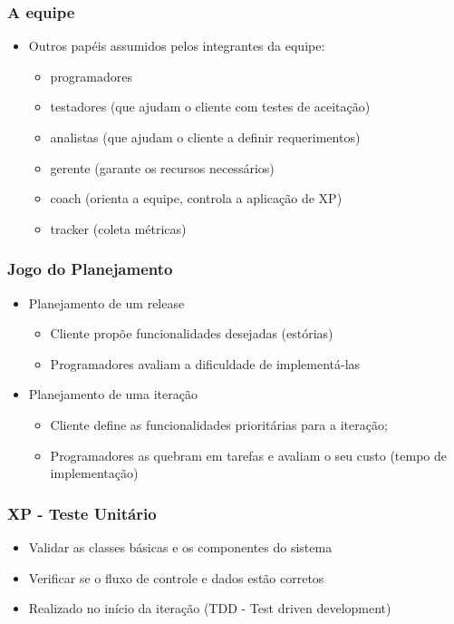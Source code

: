 \begin{frame}
 \frametitle{A equipe}
 \begin{itemize}
  \item  Outros papéis assumidos pelos integrantes da equipe:
  \begin{itemize}
   \item programadores
   \item  testadores (que ajudam o cliente com testes de
aceitação)
    \item analistas (que ajudam o cliente a definir requerimentos)
    \item gerente (garante os recursos necessários)
    \item coach (orienta a equipe, controla a aplicação de XP)
    \item tracker (coleta métricas)
  \end{itemize}
 \end{itemize}
\end{frame}


\begin{frame}
 \frametitle{Jogo do Planejamento}
 \begin{itemize}
  \item Planejamento de um release
  \begin{itemize}
   \item  Cliente propõe funcionalidades desejadas (estórias)
    \item Programadores avaliam a dificuldade de
implementá-las
  \end{itemize}
  \item Planejamento de uma iteração
  \begin{itemize}
   \item Cliente define as funcionalidades prioritárias para a
iteração;
  \item Programadores as quebram em tarefas e avaliam o
seu custo (tempo de implementação)
  \end{itemize}
 \end{itemize}
\end{frame}

\begin{frame}
 \frametitle{XP - Teste Unitário}
 \begin{itemize}
  \item  Validar as classes básicas e os componentes do sistema 
  \item Verificar se o fluxo de controle e dados estão corretos
  \item  Realizado no início da iteração (TDD - Test driven development)
 \end{itemize}
\end{frame}

